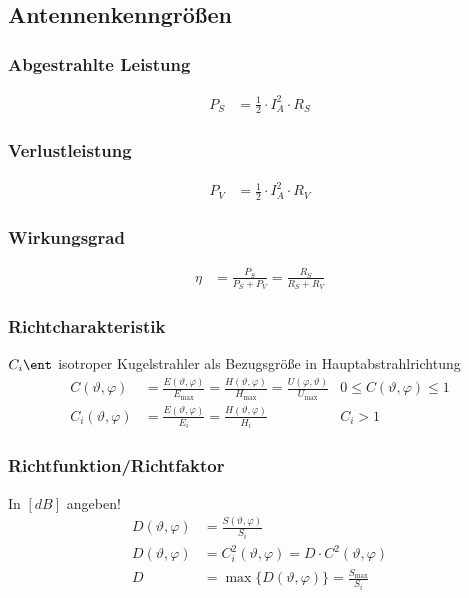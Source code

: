 \subsection{Antennenkenngrößen}



\subsubsection{Abgestrahlte Leistung}
\begin{align*}
    P_S & = \frac{1}{2}\cdot I_A^2 \cdot R_S
\end{align*}

\subsubsection{Verlustleistung}
\begin{align*}
    P_V & = \frac{1}{2}\cdot I_A^2\cdot R_V
\end{align*}

\subsubsection{Wirkungsgrad}
\begin{align*}
    \eta & = \frac{P_S}{P_S + P_V} = \frac{R_S}{R_S + R_V}
\end{align*}

\subsubsection{Richtcharakteristik}
$C_{i} \ent$ isotroper Kugelstrahler als Bezugsgröße in Hauptabstrahlrichtung
\begin{align*}
    C(\vartheta, \varphi)     & = \frac{E(\vartheta, \varphi)}{E_{\max}}=\frac{H(\vartheta, \varphi)}{H_{\max}} = \frac{U(\varphi,\vartheta)}{U_{\max}} & 0 \leq C(\vartheta, \varphi) \leq 1 \\
    C_{i}(\vartheta, \varphi) & = \frac{E(\vartheta, \varphi)}{E_{i}}=\frac{H(\vartheta, \varphi)}{H_{i}}                                               & C_{i}>1
\end{align*}

\subsubsection{Richtfunktion/Richtfaktor}
In $[\si{dB}]$ angeben!
\begin{align*}
    D(\vartheta, \varphi) & = \frac{S(\vartheta, \varphi)}{S_{i}}                               \\
    D(\vartheta, \varphi) & = C_{i}^{2}(\vartheta, \varphi) = D \cdot C^{2}(\vartheta, \varphi) \\
    D                     & = \max \{D(\vartheta, \varphi)\} = \frac{S_{\max}}{S_{i}}
\end{align*}


